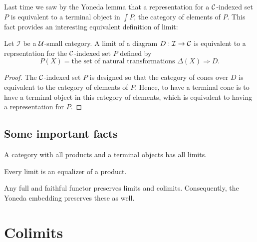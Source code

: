 Last time we saw by the Yoneda lemma that a representation for a \(\mathcal C\)-indexed set \(P\)
is equivalent to a terminal object in \(\int P\), the category of elements of \(P\).
This fact provides an interesting equivalent definition of limit:
\begin{proposition}
  Let \(\mathcal I\) be a \(\mathcal U\)-small category.
  A limit of a diagram \(D : \mathcal I \to \mathcal C\)
  is equivalent to a reprsentation for the \(\mathcal C\)-indexed set \(P\) defined by
  \[
     P(X) = \text{the set of natural transformations }\Delta(X) \Rightarrow D.
  \]
\end{proposition}
\begin{proof}
  The \(\mathcal C\)-indexed set \(P\) is designed so that
  the category of cones over \(D\) is equivalent to the category of elements of \(P\).
  Hence, to have a terminal cone is to have a terminal object in this category of elements,
which is equivalent to having a representation for \(P\).
\end{proof}


\subsection{Some important facts}

\begin{proposition}
  A category with all products and a terminal objects has all limits.
\end{proposition}

\begin{proposition}
  Every limit is an equalizer of a product.
\end{proposition}

\begin{proposition}
  Any full and faithful functor preserves limits and colimits.
  Consequently,
  the Yoneda embedding preserves these as well.
\end{proposition}

\section{Colimits}